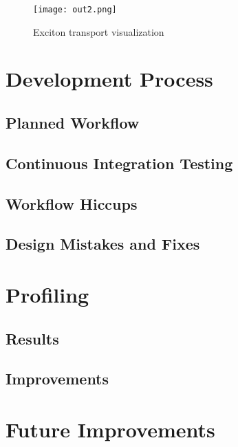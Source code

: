 \documentclass{article}
\begin{document}
\begin{figure}
    \centering
   \texttt{[image: out2.png]}
    \caption{Exciton transport visualization}
    \label{fig:my_label}
\end{figure}

\section{Development Process}

\subsection{Planned Workflow}

\subsection{Continuous Integration Testing}

\subsection{Workflow Hiccups}

\subsection{Design Mistakes and Fixes}



\section{Profiling}

\subsection{Results}

\subsection{Improvements}




\section{Future Improvements}





\printbibliography
\end{document}
